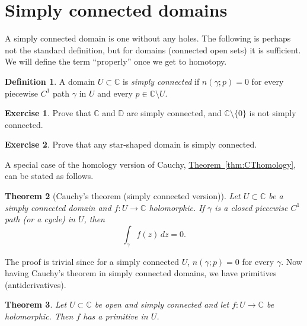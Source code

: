 \documentclass[12pt,openany]{book}
\newcommand{\C}{{\mathbb{C}}}
\newcommand{\D}{{\mathbb{D}}}
\newcommand{\myindex}[1]{#1\index{#1}}
\theoremstyle{plain}
\newtheorem{thm}{Theorem}[section]
\theoremstyle{remark}
\theoremstyle{definition}
\newtheorem{defn}[thm]{Definition}
\newenvironment{exbox}{%
    \def\FrameCommand{\vrule width 1pt \relax\hspace {10pt}}%
    \MakeFramed {\advance \hsize -\width \FrameRestore }%
}{%
    \endMakeFramed
}
\theoremstyle{exercise}
\newtheorem{exercise}{Exercise}[section]
\theoremstyle{example}
\newcommand{\thmref}[1]{\hyperref[#1]{Theorem~\ref*{#1}}}
\begin{document}

\section{Simply connected domains}

A simply connected domain is one without any holes.  The following is
perhaps not the standard definition, but for domains (connected open sets)
it is sufficient.  We will define the term ``properly'' once we get 
to homotopy.

\begin{defn} \label{defn:simplyconnected:homology}
A domain $U \subset \C$ is \emph{\myindex{simply connected}}
if $n(\gamma;p) = 0$ for every
piecewise $C^1$ path $\gamma$ in $U$ and every $p \in \C \setminus U$.
\end{defn}

\begin{exbox}
\begin{exercise}
Prove that $\C$ and $\D$ are simply connected, and $\C \setminus \{ 0 \}$
is not simply connected.
\end{exercise}

\begin{exercise}
Prove that any star-shaped domain is simply connected.
\end{exercise}
\end{exbox}

A special case of the homology version of Cauchy,
\thmref{thm:CThomology}, can be stated as follows.

\begin{thm}[Cauchy's theorem (simply connected version)]
%
Let $U \subset \C$ be a simply connected domain and $f \colon U \to \C$
holomorphic.  If $\gamma$ is a
closed
piecewise $C^1$ path (or a cycle) in $U$, then
\begin{equation*}
\int_\gamma f(z) \, dz = 0 .
\end{equation*}
\end{thm}

The proof is trivial since for a simply connected $U$, $n(\gamma;p) = 0$
for every $\gamma$.  Now having Cauchy's theorem in simply connected
domains, we have primitives (antiderivatives).

\begin{thm}
Let $U \subset \C$ be open and simply connected and
let $f \colon U \to \C$ be holomorphic.  Then $f$ has a
primitive in $U$.
\end{thm}
\end{document}
